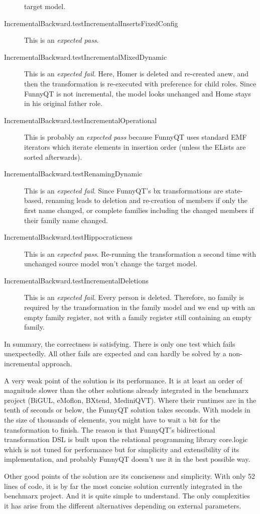 \documentclass[a4paper]{article}
\begin{document}
\begin{description}
  target model.
\item[IncrementalBackward.testIncrementalInsertsFixedConfig] This is an
  \emph{expected pass}.
\item[IncrementalBackward.testIncrementalMixedDynamic] This is an
  \emph{expected fail}.  Here, Homer is deleted and re-created anew, and then
  the transformation is re-executed with preference for child roles.  Since
  FunnyQT is not incremental, the model looks unchanged and Home stays in his
  original father role.
\item[IncrementalBackward.testIncrementalOperational] This is probably an
  \emph{expected pass} because FunnyQT uses standard EMF iterators which
  iterate elements in insertion order (unless the ELists are sorted
  afterwards).
\item[IncrementalBackward.testRenamingDynamic] This is an \emph{expected fail}.
  Since FunnyQT's bx transformations are state-based, renaming leads to
  deletion and re-creation of members if only the first name changed, or
  complete families including the changed members if their family name changed.
\item[IncrementalBackward.testHippocraticness] This is an \emph{expected pass}.
  Re-running the transformation a second time with unchanged source model won't
  change the target model.
\item[IncrementalBackward.testIncrementalDeletions] This is an \emph{expected
    fail}.  Every person is deleted.  Therefore, no family is required by the
  transformation in the family model and we end up with an empty family
  register, not with a family register still containing an empty family.
\end{description}

In summary, the correctness is satisfying.  There is only one test which fails
unexpectedly.  All other fails are expected and can hardly be solved by a
non-incremental approach.

A very weak point of the solution is its performance.  It is at least an order
of magnitude slower than the other solutions already integrated in the
benchmarx project (BiGUL, eMoflon, BXtend, MediniQVT).  Where their runtimes
are in the tenth of seconds or below, the FunnyQT solution takes seconds.  With
models in the size of thousands of elements, you might have to wait a bit for
the transformation to finish.  The reason is that FunnyQT's bidirectional
transformation DSL is built upon the relational programming library core.logic
which is not tuned for performance but for simplicity and extensibility of its
implementation, and probably FunnyQT doesn't use it in the best possible way.

Other good points of the solution are its conciseness and simplicity.  With
only 52 lines of code, it is by far the most concise solution currently
integrated in the benchmarx project.  And it is quite simple to understand.
The only complexities it has arise from the different alternatives depending on
external parameters.




\end{document}
